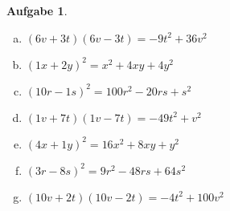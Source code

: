 \documentclass[12pt,fleqn]{article}
\theoremstyle{aufg}
\newtheorem{aufgabe}{Aufgabe}
\theoremstyle{bsp}
\begin{document}
\begin{flushleft}
\begin{aufgabe}
\begin{multicols}{3}
\begin{enumerate}[a)]
$(4r-4s)^2=16 r^{2} - 32 r s + 16 s^{2}$
\item 
$(6v+3t)(6v-3t)=- 9 t^{2} + 36 v^{2}$
\item 
$(1x+2y)^2=x^{2} + 4 x y + 4 y^{2}$
\item 
$(10r-1s)^2=100 r^{2} - 20 r s + s^{2}$
\item 
$(1v+7t)(1v-7t)=- 49 t^{2} + v^{2}$
\item 
$(4x+1y)^2=16 x^{2} + 8 x y + y^{2}$
\item 
$(3r-8s)^2=9 r^{2} - 48 r s + 64 s^{2}$
\item 
$(10v+2t)(10v-2t)=- 4 t^{2} + 100 v^{2}$
\end{enumerate} 
\end{multicols} 
\end{aufgabe} 
\end{flushleft} 
\end{document}
